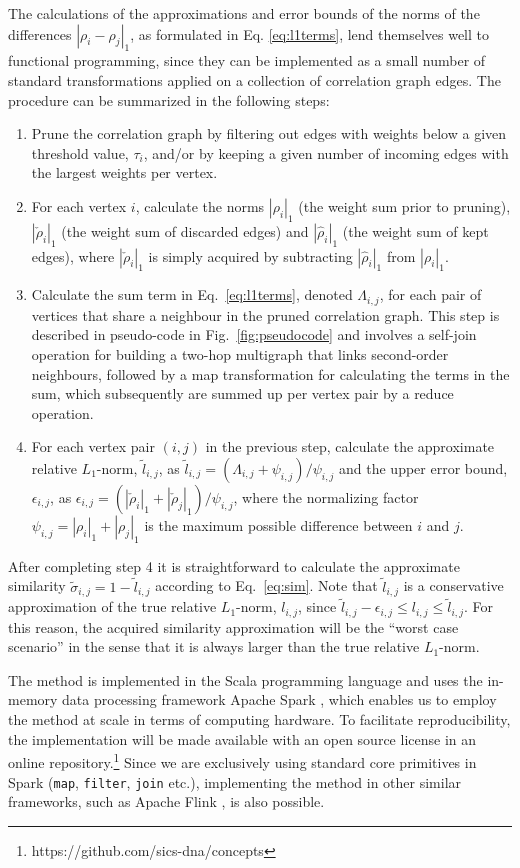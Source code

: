 \documentclass[conference]{IEEEtran}
\newcommand{\rn}[1]{\rho_{#1}}
\newcommand{\rns}[1]{|\rn{#1}|_1}
\newcommand{\mrn}[1]{\tau_{#1}}
\newcommand{\drns}[1]{|\check{\rho}_{#1}|_1}
\newcommand{\krns}[1]{|\hat{\rho}_{#1}|_1}
\newcommand{\asy}[1]{\tilde{\sigma}_{#1}}
\newcommand{\dnm}[2]{|\rn{#1}-\rn{#2}|_1}
\begin{document}
The calculations of the approximations and error bounds of the norms of the differences
$\dnm{i}{j}$, as formulated in Eq. \ref{eq:l1terms}, lend themselves well to functional
programming, since they can be implemented as a small number of standard transformations applied
on a collection of correlation graph edges. The procedure can be summarized in the following
steps:
\begin{enumerate}
\item Prune the correlation graph by filtering out edges with weights below a given threshold value, $\mrn{i}$, and/or 
by keeping a given number of incoming edges with the largest weights per vertex.
\item For each vertex $i$, calculate the norms $\rns{i}$ (the weight sum prior
to pruning), $\drns{i}$ (the weight sum of discarded edges) and $\krns{i}$
(the weight sum of kept edges), where $\drns{i}$ is simply acquired by
subtracting $\krns{i}$ from $\rns{i}$.
\item Calculate the sum term in Eq.\ \ref{eq:l1terms}, denoted $\Lambda_{i,j}$,
for each pair of vertices that share a neighbour in the pruned correlation graph.
This step is described in pseudo-code in Fig.\ \ref{fig:pseudocode} and
involves a self-join operation for building a two-hop multigraph that links
second-order neighbours, followed by a map transformation for calculating the
terms in the sum, which subsequently are summed up per vertex pair by a reduce
operation.
\item For each vertex pair $(i,j)$ in the previous step, calculate the
approximate relative $L_1$-norm, $\tilde{l}_{i,j}$, as $\tilde{l}_{i,j} =
(\Lambda_{i,j} + \psi_{i,j})/\psi_{i,j}$ and the upper error bound,
$\epsilon_{i,j}$, as $\epsilon_{i,j} = (\drns{i} + \drns{j})/\psi_{i,j}$,
where the normalizing factor $\psi_{i,j} = \rns{i} + \rns{j}$ is
the maximum possible difference between $i$ and $j$.
\end{enumerate}
After completing step 4 it is straightforward to calculate the approximate
similarity $\asy{i,j} = 1 - \tilde{l}_{i,j}$ according to Eq.\ \ref{eq:sim}.
Note that $\tilde{l}_{i,j}$ is a conservative approximation of the true
relative $L_1$-norm, $l_{i,j}$, since $\tilde{l}_{i,j} - \epsilon_{i,j} \leq
l_{i,j} \leq \tilde{l}_{i,j}$. For this reason, the acquired similarity
approximation will be the ``worst case scenario'' in the sense that it is always larger than the true relative $L_1$-norm.

The method is implemented in the Scala programming language and uses the in-memory
data processing framework Apache Spark \cite{Zaharia-2012}, which enables us
to employ the method at scale in terms of computing hardware.
To facilitate reproducibility, the implementation will be made available
with an open source license in an online repository.\footnote{https://github.com/sics-dna/concepts}
 Since we are exclusively using standard core primitives in Spark (\texttt{map},
\texttt{filter}, \texttt{join} etc.), implementing the
method in other similar frameworks, such as Apache Flink \cite{Alexandrov14}, is also
possible.
\end{document}

